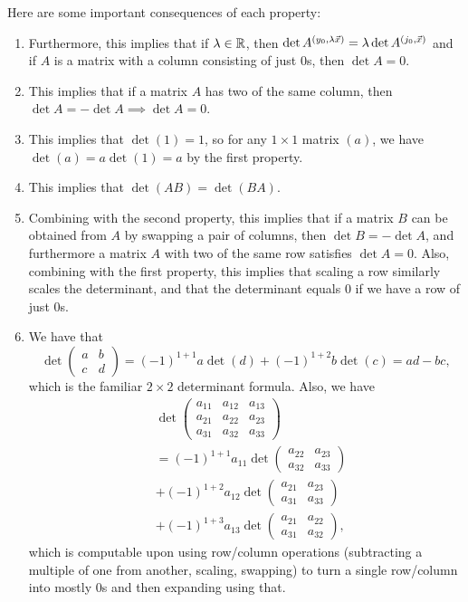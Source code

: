 \documentclass[main.tex]{subfiles}
\begin{document}
Here are some important consequences of each property:
\begin{enumerate}
    \item Furthermore, this implies that if $\lambda\in \mathbb R$, then $\det A^{(y_0, \lambda\vec{x})} = \lambda\det A^{(j_0, \vec{x})}$ and if $A$ is a matrix with a column consisting of just $0$s, then $\det A = 0$.
    \item This implies that if a matrix $A$ has two of the same column, then $\det A = -\det A\implies \det A = 0$.
    \item This implies that $\det(1) = 1$, so for any $1\times 1$ matrix $(a)$, we have $\det (a) = a\det (1) = a$ by the first property.
    \item This implies that $\det(AB) = \det(BA)$.
    \item Combining with the second property, this implies that if a matrix $B$ can be obtained from $A$ by swapping a pair of columns, then $\det B = - \det A$, and furthermore a matrix $A$ with two of the same row satisfies $\det A = 0$. Also, combining with the first property, this implies that scaling a row similarly scales the determinant, and that the determinant equals $0$ if we have a row of just $0$s.
    \item We have that
    \[\det \begin{pmatrix} a & b \\ c & d\end{pmatrix} = (-1)^{1 + 1}a\det (d) + (-1)^{1 + 2}b\det (c) = ad - bc,\]
    which is the familiar $2\times 2$ determinant formula. Also, we have
    \begin{align*}
        &\det \begin{pmatrix}
        a_{11} & a_{12} & a_{13} \\
        a_{21} & a_{22} & a_{23} \\
        a_{31} & a_{32} & a_{33}
    \end{pmatrix} \\
        &= (-1)^{1 + 1}a_{11}\det\begin{pmatrix} a_{22} & a_{23} \\ a_{32} & a_{33}\end{pmatrix} \\
        &+ (-1)^{1 + 2}a_{12}\det\begin{pmatrix} a_{21} & a_{23} \\ a_{31} & a_{33}\end{pmatrix} \\
        &+ (-1)^{1 + 3}a_{13}\det\begin{pmatrix} a_{21} & a_{22} \\ a_{31} & a_{32}\end{pmatrix},
    \end{align*}
    which is computable upon using row/column operations (subtracting a multiple of one from another, scaling, swapping) to turn a single row/column into mostly $0$s and then expanding using that.
\end{enumerate}
\end{document}
